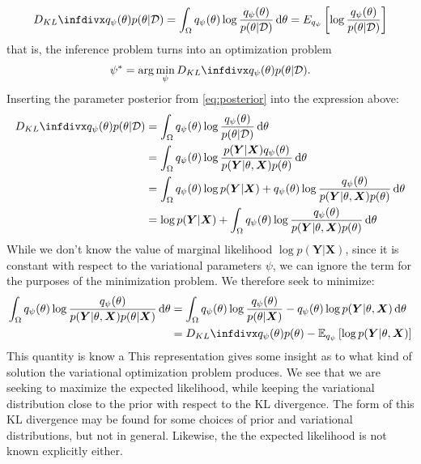 \begin{align}
    \kld{q_\psi(\theta)}{p(\theta|\D)} 
    = \int_{\Omega} q_\psi(\theta)\log{\frac{q_\psi(\theta)}{p(\theta|\D)}} \dd{\theta} 
    = E_{q_\psi}\left[\log{\frac{q_\psi(\theta)}{p(\theta|\D)}}\right]
\end{align}
that is, the inference problem turns into an optimization problem 
\begin{align}
    \psi^\ast=\arg\min_{\psi}{\kld{q_\psi(\theta)}{p(\theta|\D)} }.
\end{align} 
Inserting the parameter posterior from \cref{eq:posterior} into the expression above:
\begin{align}
    \kld{q_\psi(\theta)}{p(\theta|\D)} 
    &= \int_{\Omega} q_\psi(\theta)\log{\frac{q_\psi(\theta)}{p(\theta|\D)}} \dd{\theta} \\
    &= \int_{\Omega} q_\psi(\theta)\log{\frac{p(\bm{Y}|\bm{X})q_\psi(\theta)}{p(\bm{Y} |\theta, \bm{X}) p(\theta)}} \dd{\theta} \\
    &= \int_{\Omega} q_\psi(\theta)\log{p(\bm Y|\bm{X})} + q_\psi(\theta)\log{\frac{q_\psi(\theta)}{p(\bm{Y} |\theta, \bm{X}) p(\theta)}} \dd{\theta} \\
    &= \log{p(\bm{Y}|\bm{X})} + \int_{\Omega} q_\psi(\theta)\log{\frac{q_\psi(\theta)}{p(\bm{Y} |\theta, \bm{X}) p(\theta)}} \dd{\theta} 
\end{align}
While we don't know the value of marginal likelihood $\log{p(\bm{Y}|\bm{X})}$, since it is constant with respect to the variational parameters $\psi$, we can ignore the term for the purposes of the minimization problem.
We therefore seek to minimize:
\begin{align} \label{eq:elbo}
    \int_{\Omega} q_\psi(\theta)\log{\frac{q_\psi(\theta)}{p(\bm{Y} |\theta, \bm{X}) p(\theta|\bm{X})}} \dd{\theta} 
    &= \int_{\Omega} q_\psi(\theta) \log{\frac{q_\psi(\theta)}{p(\theta|\bm{X})}} -q_\psi(\theta)\log{p(\bm{Y} |\theta, \bm{X})} \dd{\theta}\\
    &= \kld{q_\psi(\theta)}{p(\theta)}  - \E_{q_\psi}\left[ \log{p(\bm{Y} |\theta, \bm{X})}  \right] 
\end{align}
This quantity is know a 
This representation gives some insight as to what kind of solution the variational optimization problem produces. 
We see that we are seeking to maximize the expected likelihood, while keeping the variational distribution close to the prior with respect to the KL divergence.
The form of this KL divergence may be found for some choices of prior and variational distributions, but not in general.
Likewise, the the expected likelihood is not known explicitly either.

